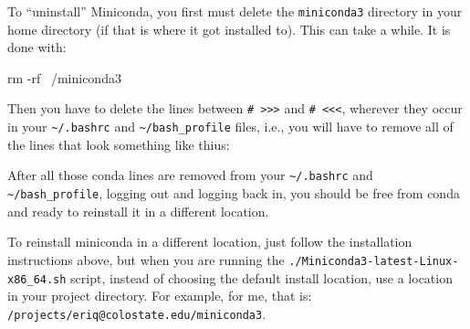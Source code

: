 \documentclass[]{krantz}
\makeatletter
\newenvironment{Shaded}{\begin{snugshade}}{\end{snugshade}}
\newcommand{\BuiltInTok}[1]{#1}
\newcommand{\CommentTok}[1]{\textcolor[rgb]{0.37,0.37,0.37}{\textit{#1}}}
\newcommand{\ExtensionTok}[1]{#1}
\newcommand{\FunctionTok}[1]{\textcolor[rgb]{0,0,0}{#1}}
\newcommand{\KeywordTok}[1]{\textcolor[rgb]{0.27,0.27,0.27}{\textbf{#1}}}
\newcommand{\NormalTok}[1]{#1}
\newcommand{\OperatorTok}[1]{\textcolor[rgb]{0.43,0.43,0.43}{\textbf{#1}}}
\newcommand{\OtherTok}[1]{\textcolor[rgb]{0.37,0.37,0.37}{#1}}
\newcommand{\StringTok}[1]{\textcolor[rgb]{0.5,0.5,0.5}{#1}}
\newcommand{\VariableTok}[1]{\textcolor[rgb]{0,0,0}{#1}}
\newenvironment{kframe}{%
\medskip{}
\setlength{\fboxsep}{.8em}
 \def\at@end@of@kframe{}%
 \ifinner\ifhmode%
  \def\at@end@of@kframe{\end{minipage}}%
  \begin{minipage}{\columnwidth}%
 \fi\fi%
 \def\FrameCommand##1{\hskip\@totalleftmargin \hskip-\fboxsep
 \colorbox{shadecolor}{##1}\hskip-\fboxsep
     \hskip-\linewidth \hskip-\@totalleftmargin \hskip\columnwidth}%
 \MakeFramed {\advance\hsize-\width
   \@totalleftmargin\z@ \linewidth\hsize
   \@setminipage}}%
 {\par\unskip\endMakeFramed%
 \at@end@of@kframe}
\renewenvironment{Shaded}{\begin{kframe}}{\end{kframe}}
\makeatother
\begin{document}
To ``uninstall'' Miniconda, you first must delete the \texttt{miniconda3} directory in your
home directory (if that is where it got installed to). This can take a while. It is done with:

\begin{Shaded}
\begin{Highlighting}[]
\FunctionTok{rm}\NormalTok{ -rf ~/miniconda3}
\end{Highlighting}
\end{Shaded}

Then you have to delete the lines between \texttt{\#\ \textgreater{}\textgreater{}\textgreater{}} and \texttt{\#\ \textless{}\textless{}\textless{}}, wherever they occur in your \texttt{\textasciitilde{}/.bashrc} and \texttt{\textasciitilde{}/bash\_profile}
files, i.e., you will have to remove all of the lines that look
something like thius:

\begin{Shaded}
\end{Shaded}

After all those conda lines are removed from your \texttt{\textasciitilde{}/.bashrc} and \texttt{\textasciitilde{}/bash\_profile}, logging out
and logging back in, you should be free from conda and ready to reinstall it in
a different location.

To reinstall miniconda in a different location, just follow the
installation instructions above, but when you are running the
\texttt{./Miniconda3-latest-Linux-x86\_64.sh} script, instead of choosing the default
install location, use a location in your project directory. For example, for me, that is:
\texttt{/projects/eriq@colostate.edu/miniconda3}.
\end{document}
